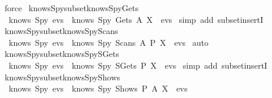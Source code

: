 \begin{isabellebody}
  \isatagproof
  \isamarkupfalse%
  \ force%
  \endisatagproof
  {\isafoldproof}%
  \isadelimproof
  \isanewline
  \endisadelimproof
  \isanewline
  \isamarkupfalse%
  \ knows{\isacharunderscore}Spy{\isacharunderscore}subset{\isacharunderscore}knows{\isacharunderscore}Spy{\isacharunderscore}Gets\ {\isacharcolon}\isanewline
  \ \ {\isachardoublequoteopen}knows\ Spy\ evs\ {\isasymsubseteq}\ knows\ Spy\ {\isacharparenleft}Gets\ A\ X\ {\isacharhash}\ evs{\isacharparenright}{\isachardoublequoteclose}\isanewline
  \isadelimproof
  \endisadelimproof
  \isatagproof
  \isamarkupfalse%
  \ {\isacharparenleft}simp\ add{\isacharcolon}\ subset{\isacharunderscore}insertI{\isacharparenright}%
  \endisatagproof
  {\isafoldproof}%
  \isadelimproof
  \isanewline
  \endisadelimproof
  \isanewline
  \isamarkupfalse%
  \ knows{\isacharunderscore}Spy{\isacharunderscore}subset{\isacharunderscore}knows{\isacharunderscore}Spy{\isacharunderscore}Scans\ {\isacharcolon}\isanewline
  \ \ {\isachardoublequoteopen}knows\ Spy\ evs\ {\isasymsubseteq}\ knows\ Spy\ {\isacharparenleft}Scans\ A\ P\ X\ {\isacharhash}\ evs{\isacharparenright}{\isachardoublequoteclose}\isanewline
  \isadelimproof
  \endisadelimproof
  \isatagproof
  \isamarkupfalse%
  \ auto%
  \endisatagproof
  {\isafoldproof}%
  \isadelimproof
  \isanewline
  \endisadelimproof
  \isanewline
  \isamarkupfalse%
  \ knows{\isacharunderscore}Spy{\isacharunderscore}subset{\isacharunderscore}knows{\isacharunderscore}Spy{\isacharunderscore}SGets\ {\isacharcolon}\isanewline
  \ \ {\isachardoublequoteopen}knows\ Spy\ evs\ {\isasymsubseteq}\ knows\ Spy\ {\isacharparenleft}SGets\ P\ X\ {\isacharhash}\ evs{\isacharparenright}{\isachardoublequoteclose}\isanewline
  \isadelimproof
  \endisadelimproof
  \isatagproof
  \isamarkupfalse%
  \ {\isacharparenleft}simp\ add{\isacharcolon}\ subset{\isacharunderscore}insertI{\isacharparenright}%
  \endisatagproof
  {\isafoldproof}%
  \isadelimproof
  \isanewline
  \endisadelimproof
  \isanewline
  \isamarkupfalse%
  \ knows{\isacharunderscore}Spy{\isacharunderscore}subset{\isacharunderscore}knows{\isacharunderscore}Spy{\isacharunderscore}Shows\ {\isacharcolon}\isanewline
  \ \ {\isachardoublequoteopen}knows\ Spy\ evs\ {\isasymsubseteq}\ knows\ Spy\ {\isacharparenleft}Shows\ P\ A\ X\ {\isacharhash}\ evs{\isacharparenright}{\isachardoublequoteclose}\isanewline
  \isadelimproof
  \endisadelimproof

\end{isabellebody}
